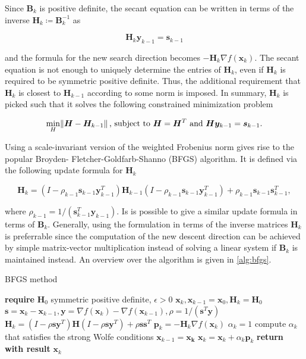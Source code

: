Since $\bm{B}_k$ is positive definite, the secant equation can be written in terms of the inverse $\bm{H}_k \coloneqq \bm{B}^{-1}_k$ as

\[
    \bm{H}_k \bm{y}_{k-1} = \bm{s}_{k-1}
\]

\noindent and the formula for the new search direction becomes $-\bm{H}_k \nabla f(\bm{x}_k)$. The secant equation is not enough to uniquely determine
the entries of $\bm{H}_k$, even if $\bm{H}_k$ is required to be symmetric positive definite. Thus, the additional requirement that $\bm{H}_k$
is closest to $\bm{H}_{k-1}$ according to some norm is imposed. In summary, $\bm{H}_k$ is picked such that it solves the following constrained
minimization problem

\begin{align*}
    \min_{H} \norm{\bm{H} - \bm{H}_{k-1}} \text{, subject to } \bm{H} = \bm{H}^T \text{ and } \bm{H}\bm{y}_{k-1} = \bm{s}_{k-1}.
\end{align*}

Using a scale-invariant version of the weighted Frobenius norm gives rise to the popular Broyden- Fletcher-Goldfarb-Shanno (BFGS) algorithm.
It is defined via the following update formula for $\bm{H}_k$

\begin{equation}\label{eq:bfgs-update}
    \bm{H}_k = (I - \rho_{k-1}\bm{s}_{k-1}\bm{y}^T_{k-1})\bm{H}_{k-1}(I - \rho_{k-1}\bm{s}_{k-1}\bm{y}^T_{k-1}) + \rho_{k-1}\bm{s}_{k-1}\bm{s}^T_{k-1},
\end{equation}

\noindent where $\rho_{k-1} = 1 / (\bm{s}^T_{k-1}\bm{y}_{k-1})$. Is is possible to give a similar update formula in terms of $\bm{B}_k$.
Generally, using the formulation in terms of the inverse matrices $\bm{H}_k$ is preferrable since the computation of the new descent 
direction can
be achieved by simple matrix-vector multiplication instead of solving a linear system if $\bm{B}_k$ is maintained instead. An overview over the
algorithm is given in \cref{alg:bfgs}.

\begin{algorithm}
\caption{BFGS method}\label{alg:bfgs}
\begin{algorithmic}
\State \textbf{require } $\bm{H}_0$ symmetric positive definite, $\epsilon > 0$
\State $\bm{x}_k, \bm{x}_{k-1} = \bm{x}_0, \bm{H}_k = \bm{H}_0 $
\State $\bm{s} = \bm{x}_k - \bm{x}_{k-1}, \bm{y} = \nabla f(\bm{x}_k) - \nabla f(\bm{x}_{k-1}), \rho = 1 / (\bm{s}^T \bm{y})$
\State $\bm{H}_k = (I - \rho \bm{s} \bm{y}^T) \bm{H}(I - \rho \bm{s} \bm{y}^T) + \rho\bm{s}\bm{s}^T$
\State $\bm{p}_k = -\bm{H}_k \nabla f(\bm{x}_k)$
\State $\alpha_k = 1$
\State compute $\alpha_k$ that satisfies the strong Wolfe conditions
\EndIf
\State $\bm{x}_{k-1} = \bm{x_k}$
\State $\bm{x}_k = \bm{x}_k + \alpha_k \bm{p}_k$
\EndWhile
\State \textbf{return with result } $\bm{x}_k$
\EndProcedure
\end{algorithmic}
\end{algorithm}

